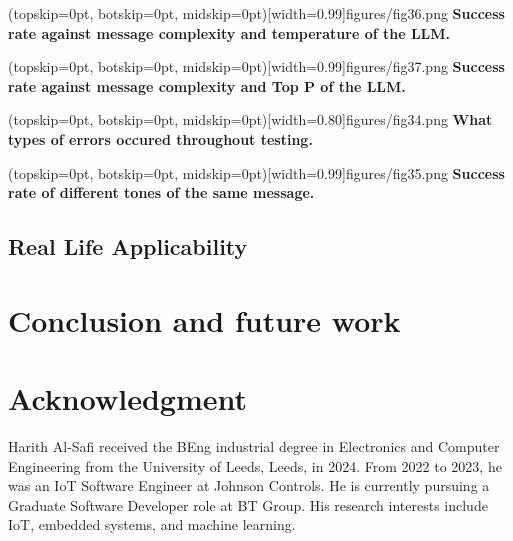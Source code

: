 \documentclass{ieeeaccess}
\begin{document}

\Figure[t!](topskip=0pt, botskip=0pt,
midskip=0pt)[width=0.99\columnwidth]{{figures/fig36.png}}
{ \textbf{Success rate against message complexity and temperature of the LLM.}\label{fig10}}

\Figure[t!](topskip=0pt, botskip=0pt,
midskip=0pt)[width=0.99\columnwidth]{{figures/fig37.png}}
{ \textbf{Success rate against message complexity and Top P of the LLM.}\label{fig11}}

\Figure[t!](topskip=0pt, botskip=0pt,
midskip=0pt)[width=0.80\columnwidth]{{figures/fig34.png}}
{ \textbf{What types of errors occured throughout testing.}\label{fig12}}

\Figure[t!](topskip=0pt, botskip=0pt,
midskip=0pt)[width=0.99\columnwidth]{{figures/fig35.png}}
{ \textbf{Success rate of different tones of the same message.}\label{fig13}}

\subsection{Real Life Applicability}

\section{Conclusion and future work}
\label{sec:conclusion}

\section*{Acknowledgment}




\begin{IEEEbiography}{Harith Al-Safi} received the BEng industrial degree in Electronics and Computer Engineering from
    the University of Leeds, Leeds, in 2024. From 2022 to 2023, he was an IoT Software Engineer at Johnson Controls. He is currently pursuing a Graduate Software Developer role at BT Group. His research interests include IoT, embedded systems, and machine learning.
\end{IEEEbiography}
\end{document}
